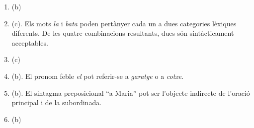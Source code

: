\begin{enumerate}
\item (b)
\item (c). Els mots \emph{la} i \emph{bata} poden pertànyer cada un a
  dues categories lèxiques diferents. De les quatre combinacions
  resultants, dues són sintàcticament acceptables.
\item (c)
\item (b). El pronom feble \emph{el} pot referir-se a \emph{garatge} o
  a \emph{cotxe}.
\item (b). El sintagma preposicional ``a Maria'' pot ser l'objecte
  indirecte de l'oració principal i de la subordinada.
\item (b)


\end{enumerate}
